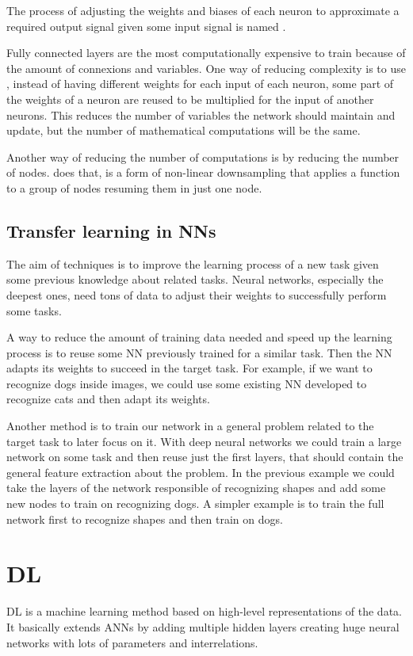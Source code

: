 The process of adjusting the weights and biases of each neuron to approximate a required output signal given some input
signal is named .

Fully connected layers are the most computationally expensive to train because of the amount of connexions and variables.
One way of reducing complexity is to use , instead of having different weights for each input of each neuron,
some part of the weights of a neuron are reused to be multiplied for the input of another neurons.
This reduces the number of variables the network should maintain and update, but the number of mathematical computations
will be the same.

Another way of reducing the number of computations is by reducing the number of nodes.
 does that, is a form of non-linear downsampling that applies a function to a group of nodes resuming them
in just one node.

\subsection{Transfer learning in \aclp{NN}}
The aim of  techniques is to improve the learning process of a new task given some previous knowledge
about related tasks.
Neural networks, especially the deepest ones, need tons of data to adjust their weights to successfully perform some tasks.

A way to reduce the amount of training data needed and speed up the learning process is to reuse some \ac{NN} previously
trained for a similar task.
Then the \ac{NN} adapts its weights to succeed in the target task.
For example, if we want to recognize dogs inside images, we could use some existing \ac{NN} developed to recognize cats and
then adapt its weights.

Another method is to train our network in a general problem related to the target task to later focus on it.
With deep neural networks we could train a large network on some task and then reuse just the first layers, that should
contain the general feature extraction about the problem.
In the previous example we could take the layers of the network responsible of recognizing shapes and add some new nodes
to train on recognizing dogs.
A simpler example is to train the full network first to recognize shapes and then train on dogs.

\section{\acl{DL}}
\acf{DL} is a machine learning method based on high-level representations of the data.
It basically extends \acp{ANN} by adding multiple hidden layers creating huge neural networks with lots of parameters and interrelations.

